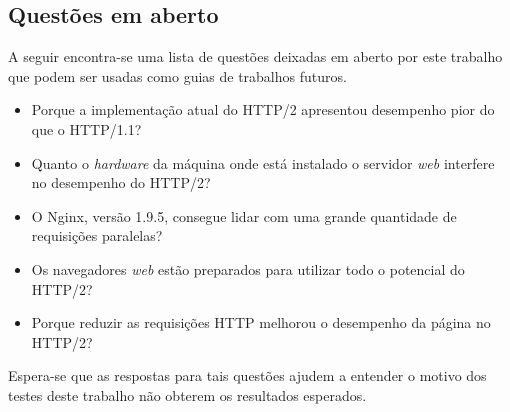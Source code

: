 \subsection{Questões em aberto}
\label{questoesemaberto}

A seguir encontra-se uma lista de questões deixadas em aberto por este trabalho que podem ser usadas como guias de trabalhos futuros.

\begin{itemize}
	\item Porque a implementação atual do HTTP/2 apresentou desempenho pior do que o HTTP/1.1?
	\item Quanto o \textit{hardware} da máquina onde está instalado o servidor \textit{web} interfere no desempenho do HTTP/2?
	\item O Nginx, versão 1.9.5, consegue lidar com uma grande quantidade de requisições paralelas?
	\item Os navegadores \textit{web} estão preparados para utilizar todo o potencial do HTTP/2?
	\item Porque reduzir as requisições HTTP melhorou o desempenho da página no HTTP/2?
\end{itemize}

Espera-se que as respostas para tais questões ajudem a entender o motivo dos testes deste trabalho não obterem os resultados esperados.